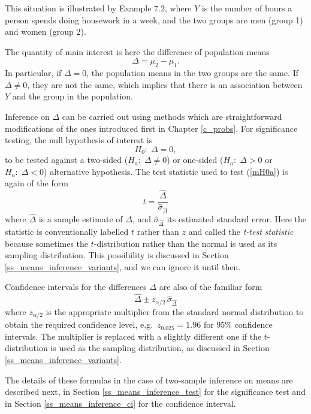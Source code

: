 This situation is illustrated by Example 7.2, where $Y$ is the number of hours
a person spends doing housework in a week, and the two groups are men
(group 1) and women (group 2).

The quantity of main interest is here the difference of population means
\begin{equation}
\Delta=\mu_{2}-\mu_{1}.
\label{DeltaB}
\end{equation}
In particular, if $\Delta=0$, the population means in the two groups are
the same. If $\Delta\ne 0$, they are not the same, which implies that there is an
association between $Y$ and the group in the population.

Inference on $\Delta$ can be carried out using methods which are
straightforward modifications of the ones introduced first in Chapter
\ref{c_probs}. For significance testing, the null hypothesis of interest
is
\begin{equation}
H_{0}: \; \Delta=0,
\label{mH0a}
\end{equation}
to be tested against a two-sided ($H_{a}:\; \Delta\ne 0$) or one-sided
($H_{a}:\; \Delta> 0$ or
$H_{a}:\; \Delta< 0$) alternative hypothesis. The test statistic used
to test (\ref{mH0a}) is again of the form
\begin{equation}
t=\frac{\hat{\Delta}}{\hat{\sigma}_{\hat{\Delta}}}
\label{tma}
\end{equation}
where $\hat{\Delta}$ is a sample estimate of $\Delta$, and
$\hat{\sigma}_{\hat{\Delta}}$ its estimated standard error. Here the
statistic is conventionally labelled $t$ rather than $z$ and called
the \emph{t-test statistic} because sometimes the
$t$-distribution rather than the normal is used as its sampling
distribution. This possibility is discussed in Section
\ref{ss_means_inference_variants}, and we can ignore it until then.

Confidence intervals for the differences
$\Delta$ are also of the familiar form
\begin{equation}
\hat{\Delta} \pm z_{\alpha/2}\, \hat{\sigma}_{\hat{\Delta}}
\label{ciDpa}
\end{equation}
where $z_{\alpha/2}$ is the appropriate multiplier from the standard
normal distribution to obtain the required confidence level, e.g.\
$z_{0.025}=1.96$ for 95\% confidence intervals. The multiplier is
replaced with a slightly different one if the $t$-distribution is used
as the sampling distribution, as discussed in Section
\ref{ss_means_inference_variants}.

The details of these formulas in the case of two-sample inference on
means are described next, in Section \ref{ss_means_inference_test} for
the significance test and in Section \ref{ss_means_inference_ci} for the
confidence interval.

